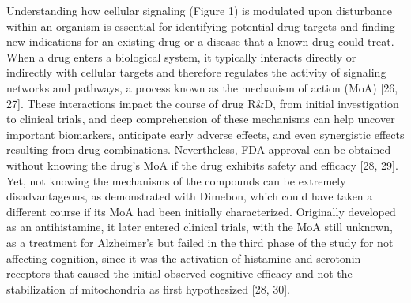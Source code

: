 Understanding how cellular signaling (Figure 1) is modulated upon disturbance within an organism is essential for identifying potential drug targets and finding new indications for an existing drug or a disease that a known drug could treat. When a drug enters a biological system, it typically interacts directly or indirectly with cellular targets and therefore regulates the activity of signaling networks and pathways, a process known as the mechanism of action (MoA) [26, 27]. These interactions impact the course of drug R\&D, from initial investigation to clinical trials, and deep comprehension of these mechanisms can help uncover important biomarkers, anticipate early adverse effects, and even synergistic effects resulting from drug combinations. Nevertheless, FDA approval can be obtained without knowing the drug’s MoA if the drug exhibits safety and efficacy [28, 29]. Yet, not knowing the mechanisms of the compounds can be extremely disadvantageous, as demonstrated with Dimebon, which could have taken a different course if its MoA had been initially characterized. Originally developed as an antihistamine, it later entered clinical trials, with the MoA still unknown, as a treatment for Alzheimer’s but failed in the third phase of the study for not affecting cognition, since it was the activation of histamine and serotonin receptors that caused the initial observed cognitive efficacy and not the stabilization of mitochondria as first hypothesized [28, 30]. 
